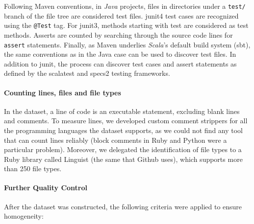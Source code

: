 \documentclass{sig-alternate}
\begin{document}
Following Maven conventions, in \emph{Java} projects, files in directories under
a \texttt{test/} branch of the file tree are considered test files.
\textsf{junit4} test cases are recognized using the \texttt{@Test} tag. For
\textsf{junit3}, methods starting with test are considered as test methods.
Asserts are counted by searching through the source code lines for
\texttt{assert} statements. Finally, as Maven underlies \emph{Scala}'s default
build system (\textsf{sbt}), the same conventions as in the Java case can be
used to discover test files. In addition to \textsf{junit}, the process can
discover test cases and assert statements as defined by the \textsf{scalatest}
and \textsf{specs2} testing frameworks.


\paragraph*{Counting lines, files and file types}

In the \pullreqs dataset, a line of code is an executable statement,
excluding blank lines and comments. To measure lines, we developed custom
comment strippers for all the programming languages the dataset supports, as
we could not find any tool that can count lines reliably (block comments in Ruby and Python were a particular problem).
Moreover, we delegated the identification of file types to a Ruby library
called Linguist (the same that Github uses), which supports more than 250 file types.

\paragraph*{Further Quality Control}
After the dataset was constructed, the following criteria were applied to 
ensure homogeneity:
\end{document}
